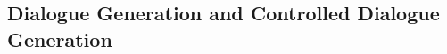 







\subsection{Dialogue Generation and Controlled Dialogue Generation}
\label{subsec:controlled_dialogue_generation}


